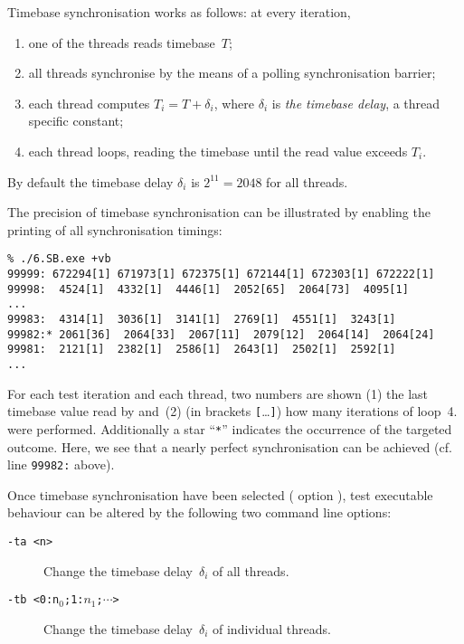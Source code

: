 Timebase synchronisation works as follows: at every iteration,
\begin{enumerate}
\item one of the threads reads timebase~$T$;
\item all threads synchronise by the means of a polling synchronisation
barrier;
\item each thread computes $T_i = T + \delta_i$, where $\delta_i$ is
\emph{the timebase delay}, a thread
specific constant;
\item each thread loops, reading the timebase until the read value exceeds
$T_i$.
\end{enumerate}
By default the timebase delay $\delta_i$ is $2^{11} = 2048$ for all threads.

The precision of timebase synchronisation can be illustrated
by enabling the printing of all synchronisation timings:
\begin{verbatim}
% ./6.SB.exe +vb
99999: 672294[1] 671973[1] 672375[1] 672144[1] 672303[1] 672222[1]
99998:  4524[1]  4332[1]  4446[1]  2052[65]  2064[73]  4095[1]
...
99983:  4314[1]  3036[1]  3141[1]  2769[1]  4551[1]  3243[1]
99982:* 2061[36]  2064[33]  2067[11]  2079[12]  2064[14]  2064[24]
99981:  2121[1]  2382[1]  2586[1]  2643[1]  2502[1]  2592[1]
...
\end{verbatim}
For each test iteration and each thread, two numbers are shown (1) the last
timebase value read by and~(2) (in brackets \verb+[+\ldots\verb+]+) how many iterations of loop~4. were performed.
Additionally a star ``\verb+*+'' indicates the occurrence
of the targeted outcome.
Here, we see that a nearly perfect synchronisation can be achieved
(cf. line \verb+99982:+ above).


Once timebase synchronisation have been selected
(\litmus{} option ),
test executable behaviour can be altered by the following
two command line options:
\begin{description}
\item[{\tt -ta <n>}]
Change the timebase delay~$\delta_i$ of all threads.
\item[{\tt -tb <0:n$_0$;1:$n_1$;$\cdots$>}]
Change the timebase delay~$\delta_i$ of individual threads.
\end{description}

